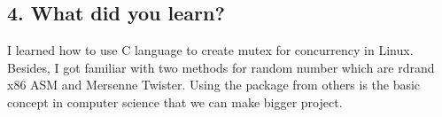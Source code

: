 \documentclass[english,10pt,letterpaper,onecolumn]{IEEEtran}
\begin{document}
\subsection*{\bf 4. What did you learn?}
I learned how to use C language to create mutex for concurrency in Linux. Besides, I got familiar with two methods for random number which are rdrand x86 ASM and Mersenne Twister. Using the package from others is the basic concept in computer science that we can make bigger project.
\end{document}
